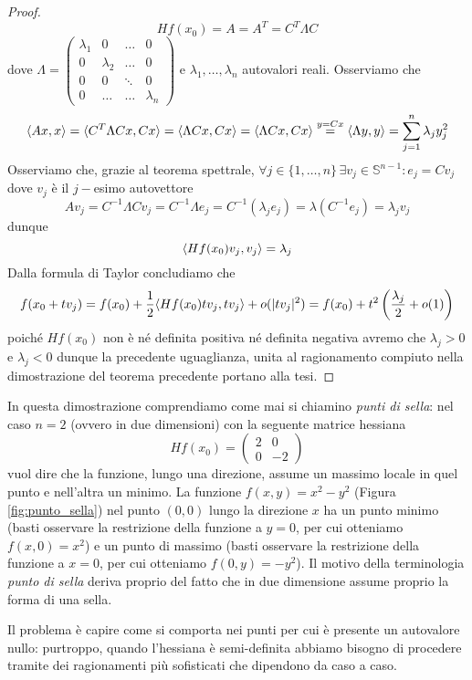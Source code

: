 \documentclass[openany, italian]{book}
\begin{document}
\begin{proof}
$$
Hf(x_0)=A=A^T=C^T \Lambda C
$$
dove $\Lambda = \begin{pmatrix} \lambda_1 & 0 & \ldots & 0 \\
0 & \lambda_2 & \ldots & 0 \\
0 & 0 & \ddots & 0 \\ 0 & \ldots & \ldots & \lambda_n \end{pmatrix}$ e $\lambda_1, \ldots, \lambda_n$ autovalori reali. Osserviamo che
$$
\langle Ax, x \rangle = \langle C^T \Lambda Cx, Cx \rangle = \langle \Lambda Cx, Cx \rangle =  \langle \Lambda Cx, Cx \rangle \stackrel{y=Cx}{=} \langle \Lambda y, y \rangle = \sum_{j=1}^n \lambda_j y_j^2
$$
Osserviamo che, grazie al teorema spettrale, $\forall j \in \{1, \ldots, n \} \, \exists v_j \in \mathbb{S}^{n-1} : e_j = Cv_j$ dove $v_j$ è il $j-$esimo autovettore
$$
Av_j = C^{-1} \Lambda Cv_j = C^{-1} \Lambda e_j = C^{-1} (\lambda_j e_j) = \lambda (C^{-1} e_j) = \lambda_j v_j
$$
dunque
$$
\langle Hf(x_0)v_j, v_j \rangle = \lambda_j
$$
Dalla formula di Taylor concludiamo che
$$
f(x_0 + tv_j) = f(x_0) + \frac{1}{2} \langle Hf(x_0)tv_j, tv_j \rangle + o(|tv_j|^2) = f(x_0) + t^2 \left( \frac{\lambda_j}{2} + o(1) \right)
$$
poiché $Hf(x_0)$ non è né definita positiva né definita negativa avremo che $\lambda_j > 0$ e $\lambda_j < 0$ dunque la precedente uguaglianza, unita al ragionamento compiuto nella dimostrazione del teorema precedente portano alla tesi.
\end{proof}
\begin{remark}
In questa dimostrazione comprendiamo come mai si chiamino \emph{punti di sella}: nel caso $n=2$ (ovvero in due dimensioni) con la seguente matrice hessiana
$$
Hf(x_0) = \begin{pmatrix}
2 & 0 \\
0 & -2
\end{pmatrix}
$$
vuol dire che la funzione, lungo una direzione, assume un massimo locale in quel punto e nell'altra un minimo. La funzione $f(x,y)=x^2-y^2$ (Figura \ref{fig:punto_sella}) nel punto $(0,0)$ lungo la direzione $x$ ha un punto minimo (basti osservare la restrizione della funzione a $y=0$, per cui otteniamo $f(x, 0)=x^2$) e un punto di massimo (basti osservare la restrizione della funzione a $x=0$, per cui otteniamo $f(0, y) = -y^2$). Il motivo della terminologia \emph{punto di sella} deriva proprio del fatto che in due dimensione assume proprio la forma di una sella.
\end{remark}
Il problema è capire come si comporta nei punti per cui è presente un autovalore nullo: purtroppo, quando l'hessiana è semi-definita abbiamo bisogno di procedere tramite dei ragionamenti più sofisticati che dipendono da caso a caso.
\end{document}
